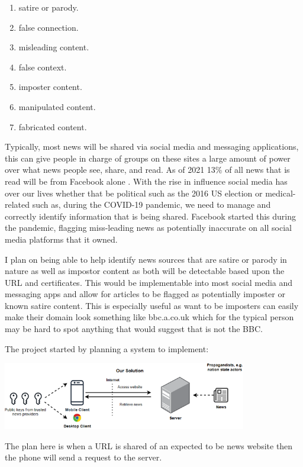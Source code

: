 \documentclass[a4paper, 11pt]{article}
\begin{document}
\begin{enumerate}
  \item satire or parody.
  \item false connection.
  \item misleading content.
  \item false context.
  \item imposter content.
  \item manipulated content.
  \item fabricated content.
\end{enumerate}

Typically, most news will be shared via social media and messaging applications, this can give people in charge of groups on these sites a large amount of power over what news people see, share, and read. As of 2021 13\% of all news that is read will be from Facebook alone \cite{Echobox}. With the rise in influence social media has over our lives whether that be political such as the 2016 US election or medical-related such as, during the COVID-19 pandemic, we need to manage and correctly identify information that is being shared. Facebook started this during the pandemic, flagging miss-leading news as potentially inaccurate on all social media platforms that it owned.

I plan on being able to help identify news sources that are satire or parody in nature as well as impostor content as both will be detectable based upon the URL and certificates. This would be implementable into most social media and messaging apps and allow for articles to be flagged as potentially imposter or known satire content. This is especially useful as want to be imposters can easily make their domain look something like bbc.a.co.uk which for the typical person may be hard to spot anything that would suggest that is not the BBC.

The project started by planning a system to implement:
\begin{center}
\includegraphics[width=0.8\textwidth]{image/diagram.png}
\end{center}

The plan here is when a URL is shared of an expected to be news website then the phone will send a request to the server.
\end{document}
